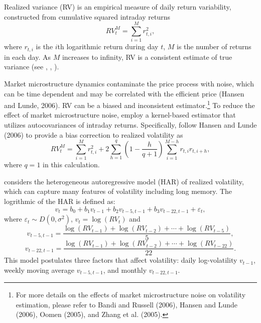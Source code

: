 \documentclass[preprint,12pt,authoryear]{elsarticle}
\begin{document}
Realized variance (RV) is an empirical measure of daily return variability, constructed from cumulative squared intraday returns
\begin{equation*}
	RV_t^M=\sum_{i=1}^{M}r_{t,i}^2,
\end{equation*}
where $r_{t,i}$ is the $i$th logarithmic return during day $t$, $M$ is the number of returns in each day. As $M$ increases to infinity, RV is a consistent estimate of true variance (see \cite{Andersen1998}, \cite{Barndorff-Nielson2002}, \cite{Andreou2009}).

Market microstructure dynamics contaminate the price process with noise, which can be time dependent and may be correlated with the efficient price (Hansen and Lunde, 2006). RV can be a biased and inconsistent estimator.\footnote{For more details on the effects of market microstructure noise on volatility estimation, please refer to Bandi and Russell (2006), Hansen and Lunde (2006), Oomen (2005), and Zhang et al. (2005).} To reduce the effect of market microstructure noise, \cite{Liu2008} employ a kernel-based estimator that utilizes autocovariances of intraday returns. Specifically, \cite{Liu2008} follow Hansen and Lunde (2006) to provide a bias correction to realized volatility as
\begin{equation*}
	RV_t^M=\sum_{i=1}^{M}r_{t,i}^2+2\sum_{h=1}^{q}(1-\frac{h}{q+1})\sum_{i=1}^{M-h}r_{t,i}r_{t,i+h},
\end{equation*}
where $q=1$ in this calculation.

\cite{Corsi2008} considers the heterogeneous autoregressive model (HAR) of realized volatility, which can capture many features of volatility including long memory.
The logrithmic of the HAR is defined as:
\begin{equation}\label{HAR}
	v_t=b_0+b_1v_{t-1}+b_2v_{t-5,t-1}+b_3v_{t-22,t-1}+\varepsilon_t,
\end{equation}
where $\varepsilon_t\sim D(0,\sigma^2)$, $v_t=\log(RV_t)$ and
\begin{equation*}
	v_{t-5,t-1}=\frac{\log(RV_{t-1})+\log(RV_{t-2})+\cdots+\log(RV_{t-5})}{5},
\end{equation*}
\begin{equation*}
	v_{t-22,t-1}=\frac{\log(RV_{t-1})+\log(RV_{t-2})+\cdots+\log(RV_{t-22})}{22}.
\end{equation*}
This model postulates three factors that affect volatility: daily log-volatility $v_{t-1}$, weekly moving average $v_{t-5,t-1}$, and monthly $v_{t-22,t-1}.$
\end{document}
